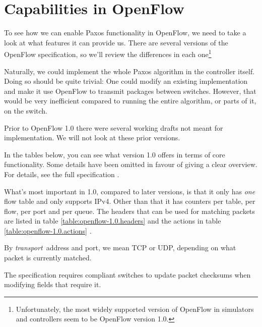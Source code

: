 \section{Capabilities in OpenFlow}
\label{chapter:details.openflow}


To see how we can enable Paxos functionality in OpenFlow, we need to take a
look at what features it can provide us.  There are several versions of the
OpenFlow specification, so we'll review the differences in each
one\footnote{Unfortunately, the most widely supported version of OpenFlow in
simulators and controllers seem to be OpenFlow version 1.0.}

Naturally, we could implement the whole Paxos algorithm in the controller
itself.  Doing so should be quite trivial: One could modify an existing
implementation and make it use OpenFlow to transmit packages between
switches.  However, that would be very inefficient compared to running the
entire algorithm, or parts of it, on the switch.

Prior to OpenFlow 1.0 \cite{openflow-1.0} there were several working
drafts not meant for implementation.  We will not look at these prior
versions.

In the tables below, you can see what version 1.0 offers in terms of core
functionality.  Some details have been omitted in favour of giving a clear
overview.  For details, see the full specification \cite{openflow-1.0}.

What's most important in 1.0, compared to later versions, is that it only
has \textit{one} flow table and only supports IPv4.  Other than that it has
counters per table, per flow, per port and per queue.  The headers that can
be used for matching packets are listed in table
\ref{table:openflow-1.0.headers}  and
the actions in table \ref{table:openflow-1.0.actions}
.

By \textit{transport} address and port, we mean \acs{TCP} or \acs{UDP},
depending on what packet is currently matched.

The specification requires compliant switches to update packet checksums
when modifying fields that require it.

